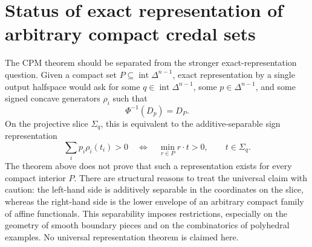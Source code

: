 \documentclass[11pt]{article}
\theoremstyle{plain}
\theoremstyle{definition}
\theoremstyle{remark}
\DeclareMathOperator{\interior}{int}
\newcommand{\DeltaN}{\Delta^{n-1}}
\begin{document}
\section{Status of exact representation of arbitrary compact credal sets}

The CPM theorem should be separated from the stronger exact-representation question. Given a compact set $P\subseteq\interior\DeltaN$, exact representation by a single output halfspace would ask for some $q\in\interior\DeltaN$, some $p\in\DeltaN$, and some signed concave generators $\rho_i$ such that
\[
\Phi^{-1}(D_p)=D_P.
\]
On the projective slice $\Sigma_q$, this is equivalent to the additive-separable sign representation
\[
\sum_i p_i\rho_i(t_i)>0
\quad\Longleftrightarrow\quad
\min_{r\in P} r\cdot t>0,
\qquad t\in\Sigma_q.
\]
The theorem above does not prove that such a representation exists for every compact interior $P$. There are structural reasons to treat the universal claim with caution: the left-hand side is additively separable in the coordinates on the slice, whereas the right-hand side is the lower envelope of an arbitrary compact family of affine functionals. This separability imposes restrictions, especially on the geometry of smooth boundary pieces and on the combinatorics of polyhedral examples. No universal representation theorem is claimed here.
\end{document}
